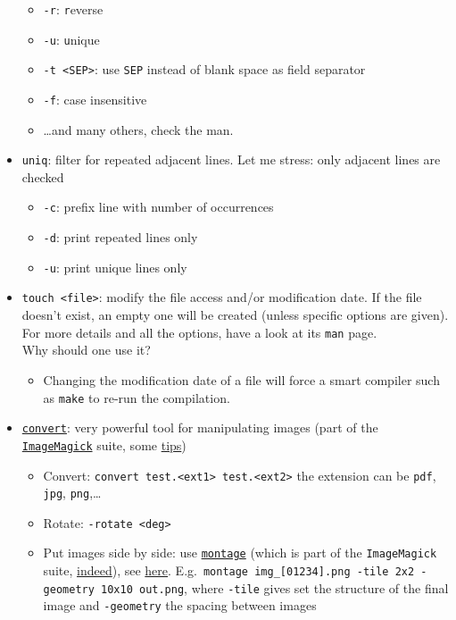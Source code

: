 \documentclass[a4paper,12pt,%
              final%
              ]{article}
\begin{document}
\begin{itemize}
\begin{itemize}
      \item \verb|-r|: \texttt{r}everse
      \item \verb|-u|: \texttt{u}nique
      \item \verb|-t <SEP>|: use \texttt{SEP} instead of blank space as field separator
      \item \verb|-f|: case insensitive
      \item \ldots and many others, check the man.
    \end{itemize}
  \item \texttt{uniq}: filter for repeated adjacent lines. Let me stress: only adjacent lines are checked
    \begin{itemize}
      \item \verb|-c|: prefix line with number of occurrences
      \item \verb|-d|: print repeated lines only
      \item \verb|-u|: print unique lines only
    \end{itemize}
  \item \verb|touch <file>|: modify the file access and/or modification date. If the file doesn't exist, an empty one will be created (unless specific options are given). For more details and all the options, have a look at its \texttt{man} page.\\
  Why should one use it?
    \begin{itemize}
      \item Changing the modification date of a file will force a smart compiler such as \verb|make| to re-run the compilation.
    \end{itemize}
  \item \href{http://www.imagemagick.org/script/convert.php}{\texttt{convert}}: very powerful tool for manipulating images (part of the \href{https://imagemagick.org/index.php}{\texttt{ImageMagick}} suite, some \href{http://www.imagemagick.org/script/command-line-processing.php}{tips})
    \begin{itemize}
      \item Convert: \verb|convert test.<ext1> test.<ext2>| the extension can be \texttt{pdf}, \texttt{jpg}, \texttt{png},\ldots
      \item Rotate: \verb|-rotate <deg>|
      \item Put images side by side: use \href{https://legacy.imagemagick.org/Usage/montage/}{\texttt{montage}} (which is part of the \texttt{ImageMagick} suite, \href{https://imagemagick.org/script/montage.php}{indeed}), see \href{https://stackoverflow.com/questions/20737061/merge-images-side-by-side-horizontally}{here}. E.g.\ \verb|montage img_[01234].png -tile 2x2 -geometry 10x10 out.png|, where \verb|-tile| gives set the structure of the final image and \verb|-geometry| the spacing between images

\end{itemize}
\end{itemize}
\end{document}
